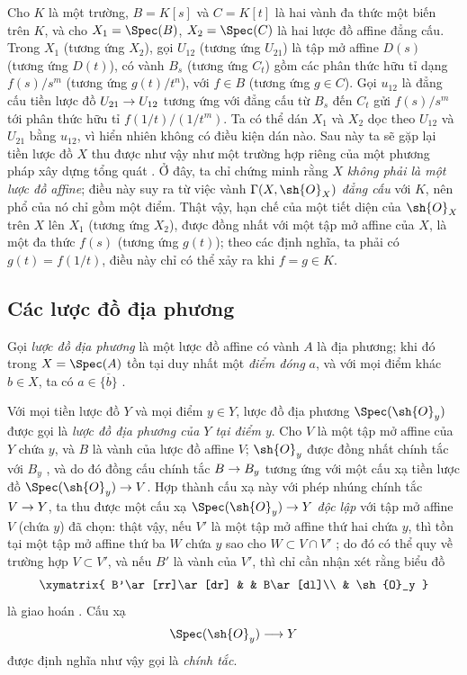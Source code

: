 \documentclass[oneside]{amsart}
\makeatletter
\newcommand{\ega@arrow}[2]{\mathchoice{#1}{#2}{#2}{#2}}
\renewcommand{\to}{\ega@arrow{\longrightarrow}{\rightarrow}}
\let\EGAOriginalLabel\label
\renewcommand{\label}[1]{\phantomsection\EGAOriginalLabel{#1}}
\makeatother
\begin{document}
\begin{example}[2.3.2]
\label{I.2.3.2}
Cho $K$ là một trường, $B=K[s]$ và $C=K[t]$ là hai vành đa thức một biến
trên $K$, và cho $X_1=\Spec(B)$, $X_2=\Spec(C)$ là hai lược đồ affine đẳng
cấu. Trong $X_1$ (tương ứng $X_2$), gọi $U_{12}$ (tương ứng $U_{21}$) là
tập mở affine $D(s)$ (tương ứng $D(t)$), có vành $B_s$ (tương ứng $C_t$)
gồm các phân thức hữu tỉ dạng $f(s)/s^m$ (tương ứng $g(t)/t^n$), với
$f\in B$ (tương ứng $g\in C$). Gọi $u_{12}$ là đẳng cấu tiền lược đồ
$U_{21}\to U_{12}$ tương ứng  với đẳng cấu từ $B_s$ đến
$C_t$ gửi $f(s)/s^m$ tới phân thức hữu tỉ $f(1/t)/(1/t^m)$. Ta có thể dán
$X_1$ và $X_2$ dọc theo $U_{12}$ và $U_{21}$ bằng $u_{12}$, vì hiển nhiên
không có điều kiện dán nào. Sau này ta sẽ gặp lại tiền lược đồ $X$ thu được
như vậy như một trường hợp riêng của một phương pháp xây dựng tổng quát
. Ở đây, ta chỉ chứng minh rằng $X$
\emph{không phải là một lược đồ affine}; điều này suy ra từ việc vành
$\Gamma(X,\sh{O}_X)$ \emph{đẳng cấu} với $K$, nên phổ của nó chỉ gồm một
điểm. Thật vậy, hạn chế của một tiết diện của $\sh{O}_X$ trên $X$ lên
$X_1$ (tương ứng $X_2$), được đồng nhất với một tập mở affine của $X$, là
một đa thức $f(s)$ (tương ứng $g(t)$); theo các định nghĩa, ta phải có
$g(t)=f(1/t)$, điều này chỉ có thể xảy ra khi $f=g\in K$.
\end{example}

\subsection{Các lược đồ địa phương}
\label{subsection:I.2.4}

\begin{env}[2.4.1]
\label{I.2.4.1}
Gọi \emph{lược đồ địa phương} là một lược đồ affine có vành $A$ là địa
phương; khi đó trong $X=\Spec(A)$ tồn tại duy nhất một \emph{điểm đóng}
$a$, và với mọi điểm khác $b\in X$, ta có
$a\in\overline{\{b\}}$ .
\end{env}

Với mọi tiền lược đồ $Y$ và mọi điểm $y\in Y$, lược đồ địa phương
$\Spec(\sh{O}_y)$ được gọi là \emph{lược đồ địa phương của $Y$ tại điểm
$y$}. Cho $V$ là một tập mở affine của $Y$ chứa $y$, và $B$ là vành của
lược đồ affine $V$; $\sh{O}_y$ được đồng nhất chính tắc với $B_y$
, và do đó đồng cấu chính tắc $B\to B_y$ tương ứng
 với một cấu xạ tiền lược đồ
$\Spec(\sh{O}_y)\to V$. Hợp thành cấu xạ này với phép nhúng chính tắc
$V\to Y$, ta thu được một cấu xạ $\Spec(\sh{O}_y)\to Y$ \emph{độc lập}
với tập mở affine $V$ (chứa $y$) đã chọn: thật vậy, nếu $V'$ là một tập mở
affine thứ hai chứa $y$, thì tồn tại một tập mở affine thứ ba $W$ chứa $y$
sao cho $W\subset V\cap V'$ ; do đó có thể quy về trường hợp
$V\subset V'$, và nếu $B'$ là vành của $V'$, thì chỉ cần nhận xét rằng
biểu đồ
\label{I.2.4.1.diagram}
\[
  \xymatrix{
    B'\ar[rr]\ar[dr] & & B\ar[dl]\\
    & \sh{O}_y
  }
\]
là giao hoán . Cấu xạ
\[
  \Spec(\sh{O}_y)\to Y
\]
được định nghĩa như vậy gọi là \emph{chính tắc}.
\end{document}
